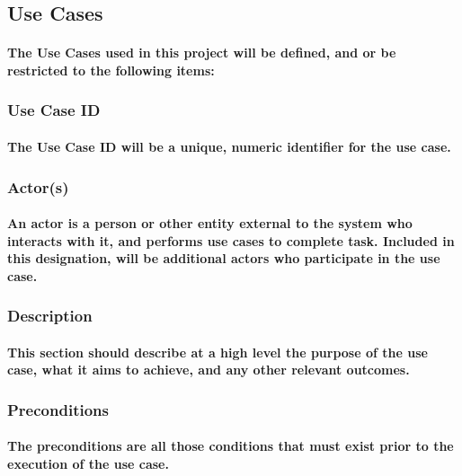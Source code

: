 \newpage

\subsection{Use Cases}
\paragraph{The Use Cases used in this project will be defined, and or be restricted to the following items:}
\subsubsection{Use Case ID}
\paragraph{The Use Case ID will be a unique, numeric identifier for the use case.}

\subsubsection{Actor(s)}
\paragraph{An actor is a person or other entity external to the system who interacts with it, and performs use cases to complete task. Included in this designation, will be additional actors who participate in the use case.}

\subsubsection{Description}
\paragraph{This section should describe at a high level the purpose of the use case, what it aims to achieve, and any other relevant outcomes.}

\subsubsection{Preconditions}
\paragraph{The preconditions are all those conditions that must exist prior to the execution of the use case.}

